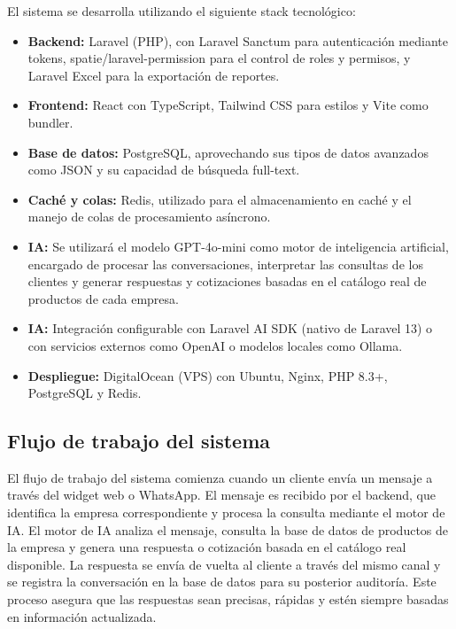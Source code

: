 El sistema se desarrolla utilizando el siguiente stack tecnológico:

\begin{itemize}
    \item \textbf{Backend:} Laravel (PHP), con Laravel Sanctum para autenticación mediante tokens, spatie/laravel-permission para el control de roles y permisos, y Laravel Excel para la exportación de reportes.
    \item \textbf{Frontend:} React con TypeScript, Tailwind CSS para estilos y Vite como bundler.
    \item \textbf{Base de datos:} PostgreSQL, aprovechando sus tipos de datos avanzados como JSON y su capacidad de búsqueda full-text.
    \item \textbf{Caché y colas:} Redis, utilizado para el almacenamiento en caché y el manejo de colas de procesamiento asíncrono.
    \item \textbf{IA:} Se utilizará el modelo GPT-4o-mini como motor de inteligencia artificial, encargado de procesar las conversaciones, interpretar las consultas de los clientes y generar respuestas y cotizaciones basadas en el catálogo real de productos de cada empresa.
    \item \textbf{IA:} Integración configurable con Laravel AI SDK (nativo de Laravel 13) o con servicios externos como OpenAI o modelos locales como Ollama.
    \item \textbf{Despliegue:} DigitalOcean (VPS) con Ubuntu, Nginx, PHP 8.3+, PostgreSQL y Redis.
\end{itemize}

\subsection{Flujo de trabajo del sistema}
\label{sec:flujo_trabajo}

El flujo de trabajo del sistema comienza cuando un cliente envía un mensaje a través del widget web o WhatsApp. El mensaje es recibido por el backend, que identifica la empresa correspondiente y procesa la consulta mediante el motor de IA. El motor de IA analiza el mensaje, consulta la base de datos de productos de la empresa y genera una respuesta o cotización basada en el catálogo real disponible. La respuesta se envía de vuelta al cliente a través del mismo canal y se registra la conversación en la base de datos para su posterior auditoría. Este proceso asegura que las respuestas sean precisas, rápidas y estén siempre basadas en información actualizada.